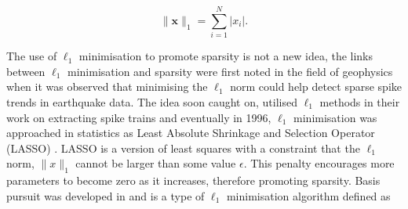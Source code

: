  


%
%


\begin{equation}
\label{eq:57}
  \|\boldsymbol{x}\|_1 = \sum_{i=1}^{N}|x_i|.
\end{equation}

The use of $\ell_1$ minimisation to promote sparsity is not a new idea, the links between $\ell_1$ minimisation and sparsity were first noted in the field of geophysics when it was observed \citep{claerbout1973} that minimising the $\ell_1$ norm could help detect sparse spike trends in earthquake data. The idea soon caught on, \cite{taylor1979} utilised $\ell_1$ methods in their work on extracting spike trains and eventually in 1996, $\ell_1$ minimisation was approached in statistics as Least Absolute Shrinkage and Selection Operator (LASSO) \citep{tibshirani1996}. LASSO is a version of least squares with a constraint that the $\ell_1$ norm, $\|x\|_1$ cannot be larger than some value $\epsilon$. This penalty encourages more parameters to become zero as it increases, therefore promoting sparsity. Basis pursuit was developed in \cite{Chen2001} and is a type of $\ell_1$ minimisation algorithm defined as 

